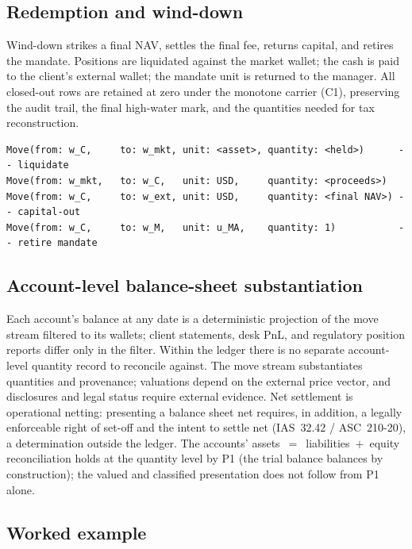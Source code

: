 \documentclass[11pt,a4paper]{article}
\begin{document}
\subsection{Redemption and wind-down}
\label{sec:managed-redemption}

Wind-down strikes a final NAV, settles the final fee, returns capital, and retires the mandate.
Positions are liquidated against the market wallet; the cash is paid to the client's external
wallet; the mandate unit is returned to the manager. All closed-out rows are retained at zero under
the monotone carrier (C1), preserving the audit trail, the final high-water mark, and the
quantities needed for tax reconstruction.
\begin{lstlisting}
Move(from: w_C,     to: w_mkt, unit: <asset>, quantity: <held>)      -- liquidate
Move(from: w_mkt,   to: w_C,   unit: USD,     quantity: <proceeds>)
Move(from: w_C,     to: w_ext, unit: USD,     quantity: <final NAV>) -- capital-out
Move(from: w_C,     to: w_M,   unit: u_MA,    quantity: 1)           -- retire mandate
\end{lstlisting}

\subsection{Account-level balance-sheet substantiation}
\label{sec:managed-substantiation}

Each account's balance at any date is a deterministic projection of the move stream filtered to its
wallets; client statements, desk PnL, and regulatory position reports differ only in the filter.
Within the ledger there is no separate account-level quantity record to reconcile against. The move
stream substantiates quantities and provenance; valuations depend on the external price vector, and
disclosures and legal status require external evidence. Net settlement is operational netting:
presenting a balance sheet net requires, in addition, a legally enforceable right of set-off and
the intent to settle net (IAS~32.42 / ASC~210-20), a determination outside the ledger. The
accounts' assets~$=$~liabilities~$+$~equity reconciliation holds at the quantity level by P1 (the
trial balance balances by construction); the valued and classified presentation does not follow
from P1 alone.

\subsection{Worked example}
\label{sec:managed-example}
\end{document}

